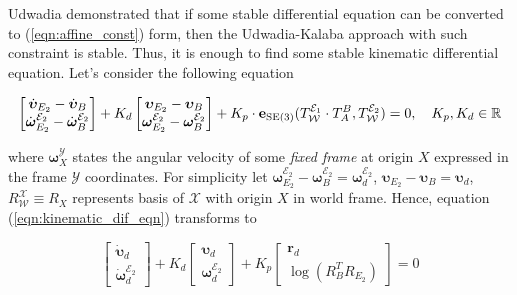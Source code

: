 Udwadia \cite{udwadia1996analytical} demonstrated that if some stable differential 
equation can be converted to (\ref{eqn:affine_const}) form, then the Udwadia-Kalaba 
approach with such constraint is stable. Thus, it is enough to find some stable 
kinematic differential equation. Let's consider the following equation 

\begin{equation}
    \begin{bmatrix}
        \dot{\boldsymbol{\upsilon}}_{E_2} - \dot{\boldsymbol{\upsilon}}_B \\
        \dot{\boldsymbol{\omega}}_{E_2}^{\mathcal{E}_2} - 
        \dot{\boldsymbol{\omega}}_B^{\mathcal{E}_2}
    \end{bmatrix} 
    + K_d 
    \begin{bmatrix}
        \boldsymbol{\upsilon}_{E_2} - \boldsymbol{\upsilon}_B \\
        \boldsymbol{\omega}_{E_2}^{\mathcal{E}_2} - 
        \boldsymbol{\omega}_B^{\mathcal{E}_2}
    \end{bmatrix}
    + K_p \cdot
    \mathbf{e}_{\text{SE}(3)}(
        T_{\mathcal{W}}^{\mathcal{E}_1} \cdot
        T_{A}^{B},
        T_{\mathcal{W}}^{\mathcal{E}_2}
    ) = 0, \quad 
    K_p, K_d \in \mathbb{R}
    \label{eqn:kinematic_dif_eqn}
\end{equation}

where $\boldsymbol{\omega}_X^{\mathcal{Y}}$ states the angular velocity of some 
\emph{fixed frame} at origin $X$ expressed in the frame $\mathcal{Y}$ coordinates.  
For simplicity let $\boldsymbol{\omega}_{E_2}^{\mathcal{E}_2} - 
\boldsymbol{\omega}_B^{\mathcal{E}_2} = \boldsymbol{\omega}_d^{\mathcal{E}_2}$, 
$\boldsymbol{\upsilon}_{E_2} - \boldsymbol{\upsilon}_B = \boldsymbol{\upsilon}_d$, 
$R_{\mathcal{W}}^{\mathcal{X}} \equiv R_X$ represents basis of $\mathcal{X}$ with 
origin $X$ in world frame. Hence, equation (\ref{eqn:kinematic_dif_eqn}) 
transforms to 

\begin{equation}
    \begin{bmatrix}
        \dot{\boldsymbol{\upsilon}}_d \\
        \dot{\boldsymbol{\omega}}_d^{\mathcal{E}_2}
    \end{bmatrix}
    + K_d
    \begin{bmatrix}
        \boldsymbol{\upsilon}_d \\
        \boldsymbol{\omega}_d^{\mathcal{E}_2}
    \end{bmatrix}
    + K_p
    \begin{bmatrix}
        \mathbf{r}_d \\
        \log (R_B^T R_{E_2})
    \end{bmatrix}
    = 0
    \label{eqn:kinematic_dif_eqn_simple}
\end{equation}

